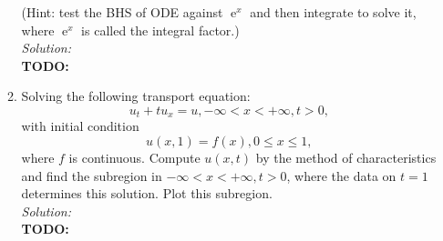 \documentclass[10pt]{amsart}
\DeclareMathOperator{\E}{e}
\theoremstyle{nonumberplain}
\begin{document}
\begin{enumerate}[label={\bf {\arabic*}:}]
\begin{enumerate}
\noindent
(Hint: test the BHS of ODE against $\E^x$ and then integrate to solve it, where $\E^x$ is called the integral factor.) \\

\noindent
\textit{Solution:} \\
\textbf{TODO: } \\

\item Solving the following transport equation:
$$
u_t + tu_x = u, -\infty < x < + \infty, t > 0,
$$
with initial condition
$$
u(x, 1) = f(x), 0 \leq x \leq 1,
$$
where $f$ is continuous.
Compute $u(x, t)$ by the method of characteristics and find the subregion in $-\infty < x < + \infty, t> 0$, where the data on $t = 1$ determines this solution.
Plot this subregion. \\

\noindent
\textit{Solution:} \\
\textbf{TODO: } \\


\end{enumerate}

\end{enumerate}
\end{document}
